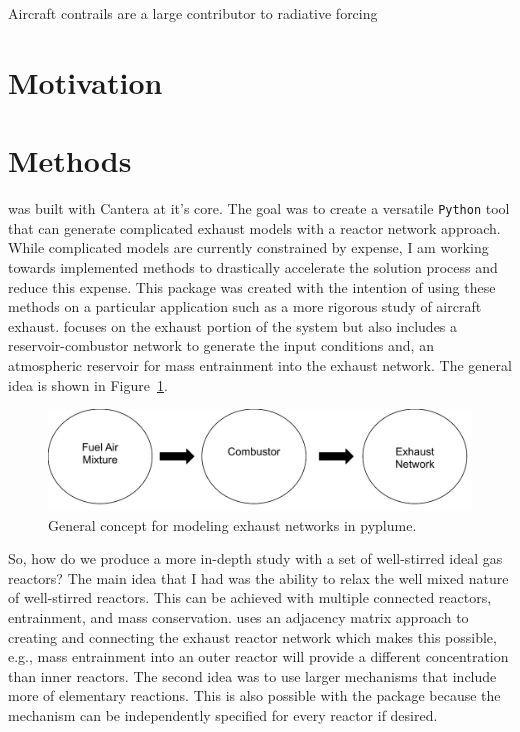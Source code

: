 \documentclass[smallextended,referee]{svjour3}
\begin{document}
Aircraft contrails are a large contributor to radiative forcing

\section{Motivation}


\section{Methods}

\pyplume{} was built with Cantera\cite{cantera} at it's core. The goal was to create a versatile \texttt{Python} tool that can generate complicated exhaust models with a reactor network approach. While complicated models are currently constrained by expense, I am working towards implemented methods to drastically accelerate the solution process and reduce this expense. This package was created with the intention of using these methods on a particular application such as a more rigorous study of aircraft exhaust. \pyplume{} focuses on the exhaust portion of the system but also includes a reservoir-combustor network to generate the input conditions and, an atmospheric reservoir for mass entrainment into the exhaust network. The general idea is shown in Figure~\ref{fig:general}.

\begin{figure}[htb!]
    \centering
    \includegraphics[scale=\SCALE]{examples/report/figures/general.pdf}
    \caption{General concept for modeling exhaust networks in pyplume.}
    \label{fig:general}
\end{figure}

So, how do we produce a more in-depth study with a set of well-stirred ideal gas reactors? The main idea that I had was the ability to relax the well mixed nature of well-stirred reactors. This can be achieved with multiple connected reactors, entrainment, and mass conservation. \pyplume{} uses an adjacency matrix approach to creating and connecting the exhaust reactor network which makes this possible, e.g., mass entrainment into an outer reactor will provide a different concentration than inner reactors. The second idea was to use larger mechanisms that include more of elementary reactions. This is also possible with the package because the mechanism can be independently specified for every reactor if desired. 
\end{document}
